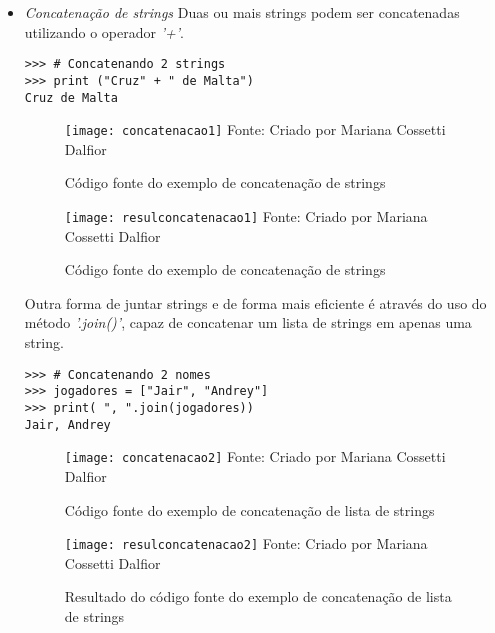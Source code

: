 \begin{itemize}
  \item \textit{Concatena\c{c}\~{a}o de strings}\newline
        Duas ou mais strings podem ser concatenadas utilizando o operador \textsl{'+'}.
        
\begin{lstlisting}
>>> # Concatenando 2 strings
>>> print ("Cruz" + " de Malta")
Cruz de Malta
\end{lstlisting}

\begin{figure}[H]
	\begin{center}
		\caption{C\'{o}digo fonte do exemplo de concatena\c{c}\~{a}o de strings} \label{fonteconcatenacao1}
		\texttt{[image: concatenacao1]} 
		\newline
		Fonte: Criado por Mariana Cossetti Dalfior
	\end{center}
\end{figure}

\begin{figure}[H]
	\begin{center}
		\caption{C\'{o}digo fonte do exemplo de concatena\c{c}\~{a}o de strings} \label{resulconcatenacao1}
		\texttt{[image: resulconcatenacao1]} 
		\newline
		Fonte: Criado por Mariana Cossetti Dalfior
	\end{center}
\end{figure}
    
Outra forma de juntar strings e de forma mais eficiente \'{e} atrav\'{e}s do uso do m\'{e}todo \textsl{'.join()'}, capaz de concatenar um lista de strings em apenas uma string.

\begin{lstlisting}
>>> # Concatenando 2 nomes
>>> jogadores = ["Jair", "Andrey"]
>>> print( ", ".join(jogadores))
Jair, Andrey
\end{lstlisting} 

\begin{figure}[H]
	\begin{center}
		\caption{C\'{o}digo fonte do exemplo de concatena\c{c}\~{a}o de lista de strings} \label{fonteconcatenacao2}
		\texttt{[image: concatenacao2]} 
		\newline
		Fonte: Criado por Mariana Cossetti Dalfior
	\end{center}
\end{figure}

\begin{figure}[H]
	\begin{center}
		\caption{Resultado do c\'{o}digo fonte do exemplo de concatena\c{c}\~{a}o de lista de strings} \label{resulconcatenacao2}
		\texttt{[image: resulconcatenacao2]} 
		\newline
		Fonte: Criado por Mariana Cossetti Dalfior
	\end{center}
\end{figure}


\end{itemize}
